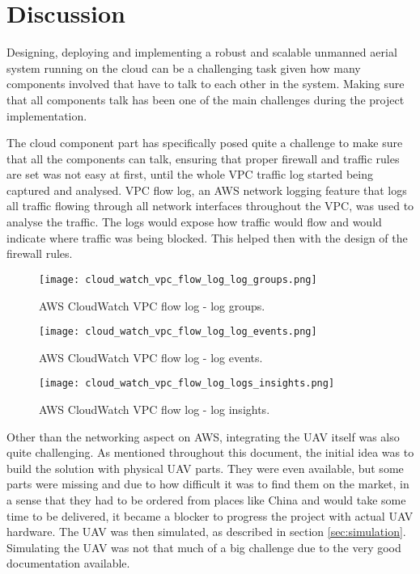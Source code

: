
\chapter{Discussion}
\label{chap:discussion}

Designing, deploying and implementing a robust and scalable unmanned aerial system running on the cloud can be a challenging task given how many components involved that have to talk to each other in the system. Making sure that all components talk has been one of the main challenges during the project implementation.

The cloud component part has specifically posed quite a challenge to make sure that all the components can talk, ensuring that proper firewall and traffic rules are set was not easy at first, until the whole VPC traffic log started being captured and analysed. VPC flow log, an AWS network logging feature that logs all traffic flowing through all network interfaces throughout the VPC, was used to analyse the traffic. The logs would expose how traffic would flow and would indicate where traffic was being blocked. This helped then with the design of the firewall rules.

\begin{figure}[H]
    \centering \texttt{[image: cloud\_watch\_vpc\_flow\_log\_log\_groups.png]}
    \caption{AWS CloudWatch VPC flow log - log groups.}
    \label{fig:cloud-watch-vpc-flow-log-log-groups}
\end{figure}

\begin{figure}[H]
    \centering \texttt{[image: cloud\_watch\_vpc\_flow\_log\_log\_events.png]}
    \caption{AWS CloudWatch VPC flow log - log events.}
    \label{fig:cloud-watch-vpc-flow-log-log-events}
\end{figure}

\begin{figure}[H]
    \centering \texttt{[image: cloud\_watch\_vpc\_flow\_log\_logs\_insights.png]}
    \caption{AWS CloudWatch VPC flow log - log insights.}
    \label{fig:cloud-watch-vpc-flow-log-log-insights}
\end{figure}

Other than the networking aspect on AWS, integrating the UAV itself  was also quite challenging. As mentioned throughout this document, the initial idea was to build the solution with physical UAV parts. They were even available, but some parts were missing and due to how difficult it was to find them on the market, in a sense that they had to be ordered from places like China and would take some time to be delivered, it became a blocker to progress the project with actual UAV hardware. The UAV was then simulated, as described in section \ref{sec:simulation}. Simulating the UAV was not that much of a big challenge due to the very good documentation available.


